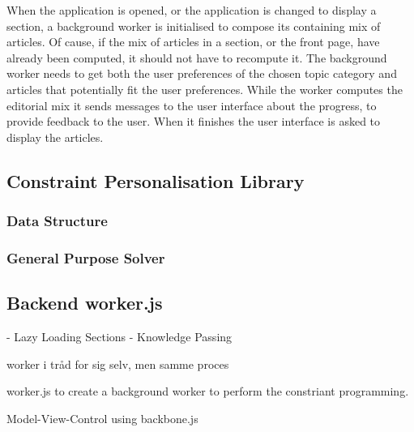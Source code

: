 
When the application is opened, or the application is changed to display a section, a background worker is initialised to compose its containing mix of articles. Of cause, if the mix of articles in a section, or the front page, have already been computed, it should not have to recompute it. The background worker needs to get both the user preferences of the chosen topic category and articles that potentially fit the user preferences. While the worker computes the editorial mix it sends messages to the user interface about the progress, to provide feedback to the user. When it finishes the user interface is asked to display the articles.



\subsection{Constraint Personalisation Library}

\subsubsection{Data Structure}
\subsubsection{General Purpose Solver}

\subsection{Backend worker.js}
  - Lazy Loading Sections
  - Knowledge Passing

worker i tråd for sig selv, men samme proces

worker.js to create a background worker to perform the constriant programming.

Model-View-Control using backbone.js

